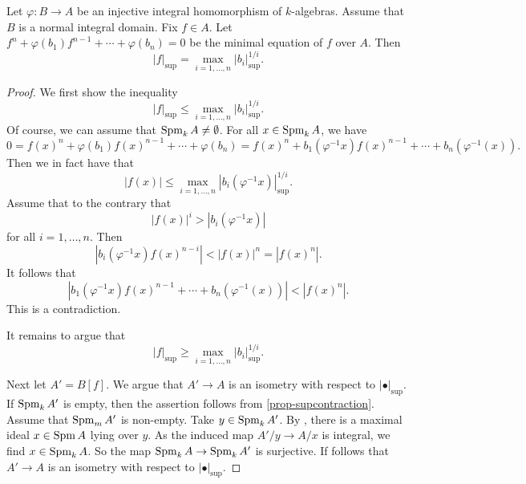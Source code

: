\begin{proposition}\label{prop-fsupspecexp}
    Let $\varphi:B\rightarrow A$ be an injective integral homomorphism of $k$-algebras. Assume that $B$ is a normal integral domain. Fix $f\in A$.
    Let $f^n+\varphi(b_1)f^{n-1}+\cdots+\varphi(b_n)=0$ be the minimal equation of $f$ over $A$. Then
    \[
        |f|_{\sup}=\max_{i=1,\ldots,n} |b_i|_{\sup}^{1/i}.  
    \]
\end{proposition}
\begin{proof}
    We first show the inequality 
    \[
        |f|_{\sup}\leq \max_{i=1,\ldots,n} |b_i|_{\sup}^{1/i}.    
    \]
    Of course, we can assume that $\operatorname{Spm}_k A\neq \emptyset$.
    For all $x\in \operatorname{Spm}_k A$, we have
    \[
        0=f(x)^n +\varphi(b_1)f(x)^{n-1}+\cdots+\varphi(b_n)=f(x)^n+b_1(\varphi^{-1}x)f(x)^{n-1}+\cdots+b_n(\varphi^{-1}(x)).
    \]
    Then we in fact have that
    \[
        |f(x)|\leq   \max_{i=1,\ldots,n} |b_i(\varphi^{-1}x)|_{\sup}^{1/i}.  
    \]
    Assume that to the contrary that 
    \[
      |f(x)|^i> |b_i(\varphi^{-1}x)|  
    \]
    for all $i=1,\ldots,n$. Then
    \[
        |b_i(\varphi^{-1}x)f(x)^{n-i}|<|f(x)|^n=|f(x)^n|.  
    \]
    It follows that 
    \[
        |b_1(\varphi^{-1}x)f(x)^{n-1}+\cdots+b_n(\varphi^{-1}(x)) |< |f(x)^n|.
    \]
    This is a contradiction.

    It remains to argue that 
    \begin{equation}\label{eq-fsupnormcompute}
        |f|_{\sup}\geq\max_{i=1,\ldots,n} |b_i|_{\sup}^{1/i}.    
    \end{equation}
    
    Next let $A'=B[f]$. We argue that $A'\rightarrow A$ is an isometry with respect to $|\bullet|_{\sup}$. If $\operatorname{Spm}_k A'$ is empty, then the assertion follows from \cref{prop-supcontraction}. Assume  that $\operatorname{Spm}_m A'$ is non-empty. Take $y\in \operatorname{Spm}_k A'$. By \cite[\href{https://stacks.math.columbia.edu/tag/00GQ}{Tag 00GQ}]{stacks-project}, there is a maximal ideal $x\in \operatorname{Spm} A$ lying over $y$. As the induced map $A'/y\rightarrow A/x$ is integral, we find $x\in \operatorname{Spm}_k A$. So the map $\operatorname{Spm}_k A\rightarrow \operatorname{Spm}_k A'$ is surjective. If follows that $A'\rightarrow A$ is an isometry with respect to $|\bullet|_{\sup}$.


\end{proof}
